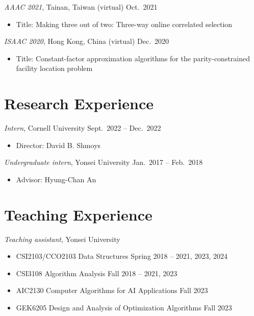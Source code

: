 \documentclass{article}
\newcommand{\killinitspace}{-0.7em}
\begin{document}
\textsl{AAAC 2021}, Tainan, Taiwan (virtual) \hfill Oct.~2021
\vspace{\killinitspace}
\begin{itemize}
\item Title: Making three out of two: Three-way online correlated selection
\end{itemize}

\textsl{ISAAC 2020}, Hong Kong, China (virtual) \hfill Dec.~2020
\vspace{\killinitspace}
\begin{itemize}
\item Title: Constant-factor approximation algorithms for the parity-constrained facility location problem
\end{itemize}

\section{Research Experience}
\textsl{Intern}, Cornell University \hfill Sept.~2022 -- Dec.~2022
\vspace{\killinitspace}
\begin{itemize}
\item Director: David B. Shmoys
\end{itemize}

\textsl{Undergraduate intern}, Yonsei University \hfill Jan.~2017 -- Feb.~2018
\vspace{\killinitspace}
\begin{itemize}
\item Advisor: Hyung-Chan An
\end{itemize}

\section{Teaching Experience}
\textsl{Teaching assistant}, Yonsei University
\vspace{\killinitspace}
\begin{itemize}
\item CSI2103/CCO2103 Data Structures \hfill Spring 2018 -- 2021, 2023, 2024
\item CSI3108 Algorithm Analysis \hfill Fall 2018 -- 2021, 2023
\item AIC2130 Computer Algorithms for AI Applications \hfill Fall 2023
\item GEK6205 Design and Analysis of Optimization Algorithms \hfill Fall 2023
\end{itemize}
\end{document}
